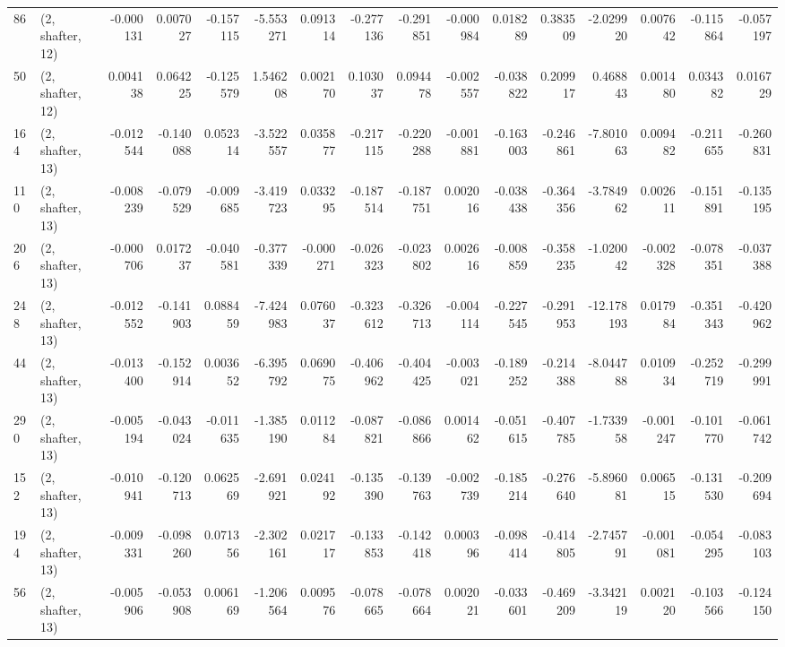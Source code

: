 \begin{tabular}{llrrrrrrrrrrrrrr}
86  &  (2, shafter, 12) &  -0.000131 &  0.007027 & -0.157115 &   -5.553271 &  0.091314 &  -0.277136 & -0.291851 & -0.000984 &  0.018289 &  0.383509 &    -2.029920 &  0.007642 & -0.115864 & -0.057197 \\
50  &  (2, shafter, 12) &   0.004138 &  0.064225 & -0.125579 &    1.546208 &  0.002170 &   0.103037 &  0.094478 & -0.002557 & -0.038822 &  0.209917 &     0.468843 &  0.001480 &  0.034382 &  0.016729 \\
164 &  (2, shafter, 13) &  -0.012544 & -0.140088 &  0.052314 &   -3.522557 &  0.035877 &  -0.217115 & -0.220288 & -0.001881 & -0.163003 & -0.246861 &    -7.801063 &  0.009482 & -0.211655 & -0.260831 \\
110 &  (2, shafter, 13) &  -0.008239 & -0.079529 & -0.009685 &   -3.419723 &  0.033295 &  -0.187514 & -0.187751 &  0.002016 & -0.038438 & -0.364356 &    -3.784962 &  0.002611 & -0.151891 & -0.135195 \\
206 &  (2, shafter, 13) &  -0.000706 &  0.017237 & -0.040581 &   -0.377339 & -0.000271 &  -0.026323 & -0.023802 &  0.002616 & -0.008859 & -0.358235 &    -1.020042 & -0.002328 & -0.078351 & -0.037388 \\
248 &  (2, shafter, 13) &  -0.012552 & -0.141903 &  0.088459 &   -7.424983 &  0.076037 &  -0.323612 & -0.326713 & -0.004114 & -0.227545 & -0.291953 &   -12.178193 &  0.017984 & -0.351343 & -0.420962 \\
44  &  (2, shafter, 13) &  -0.013400 & -0.152914 &  0.003652 &   -6.395792 &  0.069075 &  -0.406962 & -0.404425 & -0.003021 & -0.189252 & -0.214388 &    -8.044788 &  0.010934 & -0.252719 & -0.299991 \\
290 &  (2, shafter, 13) &  -0.005194 & -0.043024 & -0.011635 &   -1.385190 &  0.011284 &  -0.087821 & -0.086866 &  0.001462 & -0.051615 & -0.407785 &    -1.733958 & -0.001247 & -0.101770 & -0.061742 \\
152 &  (2, shafter, 13) &  -0.010941 & -0.120713 &  0.062569 &   -2.691921 &  0.024192 &  -0.135390 & -0.139763 & -0.002739 & -0.185214 & -0.276640 &    -5.896081 &  0.006515 & -0.131530 & -0.209694 \\
194 &  (2, shafter, 13) &  -0.009331 & -0.098260 &  0.071356 &   -2.302161 &  0.021717 &  -0.133853 & -0.142418 &  0.000396 & -0.098414 & -0.414805 &    -2.745791 & -0.001081 & -0.054295 & -0.083103 \\
56  &  (2, shafter, 13) &  -0.005906 & -0.053908 &  0.006169 &   -1.206564 &  0.009576 &  -0.078665 & -0.078664 &  0.002021 & -0.033601 & -0.469209 &    -3.342119 &  0.002120 & -0.103566 & -0.124150 \\

\end{tabular}
